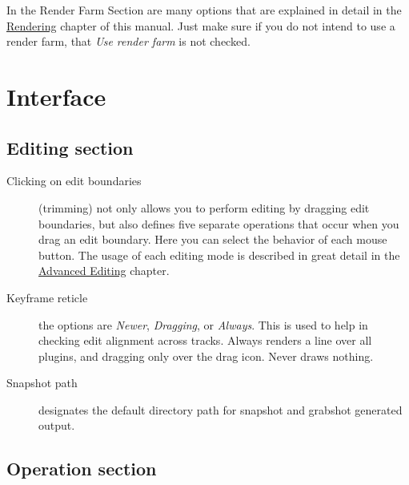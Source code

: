 In the Render Farm Section are many options that are explained in detail in the \hyperref[sec:render_farm_usage]{Rendering} chapter of this manual.  Just make sure if you do not intend to use a render farm, that \textit{Use render farm} is not checked.

\section{Interface}%
\label{sec:interface}

\subsection{Editing section}%
\label{sub:editing_section}

\begin{description}
    \item[Clicking on edit boundaries]  (trimming) \CGG{} not only allows you to perform editing by dragging edit boundaries, but also defines five separate operations that occur when you drag an edit boundary. Here you can select the behavior of each mouse button. The usage of each editing mode is described in great detail in the \hyperref[sub:split_view_compositor_using_drag_trim]{Advanced Editing} chapter.
    \item[Keyframe reticle]  the options are \textit{Newer}, \textit{Dragging}, or \textit{Always}. This is used to help in checking edit alignment across tracks.  Always renders a line over all plugins, and dragging only over the drag icon. Never draws nothing.
    \item[Snapshot path]  designates the default directory path for snapshot and grabshot generated output.
\end{description}

\subsection{Operation section}%
\label{sub:operation_section}

